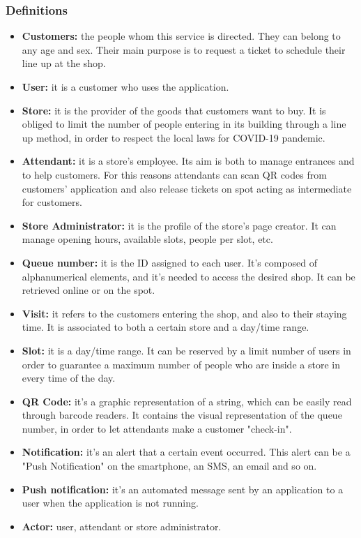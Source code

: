 \documentclass[table, 12pt]{article}
\begin{document}
\subsubsection{Definitions}
\begin{itemize}
    \item {\textbf{Customers:} the people whom this service is directed. They can belong to any age and sex. Their main purpose is to request a ticket to schedule their line up at the shop.}
    \item {\textbf{User:} it is a customer who uses the application. }\label{User}
    \item {\textbf{Store:} it is the provider of the goods that customers want to buy. It is obliged to limit the number of people entering in its building through a line up method, in order to respect the local laws for COVID-19 pandemic.}
    \item {\textbf{Attendant:} it is a store's employee. Its aim is both to manage entrances and to help customers. For this reasons attendants can scan QR codes from customers' application and also release tickets on spot acting as intermediate for customers.}
    \item \textbf{Store Administrator:} it is the profile of the store's page creator. It can manage opening hours, available slots, people per slot, etc.
    \item {\textbf{Queue number:} it is the ID assigned to each user. It's composed of alphanumerical elements, and it's needed to access the desired shop. It can be retrieved online or on the spot.}
    \item {\textbf{Visit:} it refers to the customers entering the shop, and also to their staying time. It is associated to both a certain store and a day/time range.}
    \item {\textbf{Slot:} it is a day/time range. It can be reserved by a limit number of users in order to guarantee a maximum number of people who are inside a store in every time of the day.}
    \item {\textbf{QR Code:} it's a graphic representation of a string, which can be easily read through barcode readers. It contains the visual representation of the queue number, in order to let attendants make a customer "check-in".}\label{QR}
    \item {\textbf{Notification:} it's an alert that a certain event occurred. This alert can be a "Push Notification" on the smartphone, an SMS, an email and so on.}
    \item {\textbf{Push notification:} it's an automated message sent by an application to a user when the application is not running.}
    \item \textbf{Actor:} user, attendant or store administrator.
\end{itemize}
\end{document}
